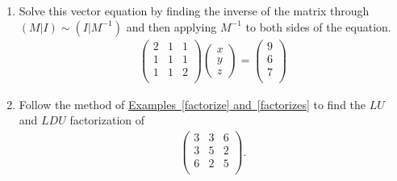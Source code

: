 \begin{enumerate}
\item Solve this vector equation by finding the inverse of the matrix through $(M|I)\sim (I|M^{-1})$ and then applying $M^{-1}$ to both sides of the equation. 
\begin{eqnarray*}
\begin{pmatrix}
2	&1 	&1 \\ %
1 	&1 	&1 \\ %
1	&1	&2 \\ %
\end{pmatrix} 
\begin{pmatrix}
 x \\ 
y \\
z 
\end{pmatrix} 
=
\begin{pmatrix}
9 \\ 
6  \\
7  \\
\end{pmatrix} 
\end{eqnarray*}



\item Follow the method of  \hyperlink{elldeeeww}{Examples~\ref{factorize} and~\ref{factorizes}} to find the $LU$ and $LDU$ factorization of 
\begin{eqnarray*}
\begin{pmatrix}
3	&3 	&6 \\ %
3 	&5 	&2 \\ %
6	&2	&5 \\ %
\end{pmatrix} .
\end{eqnarray*}





\end{enumerate}
